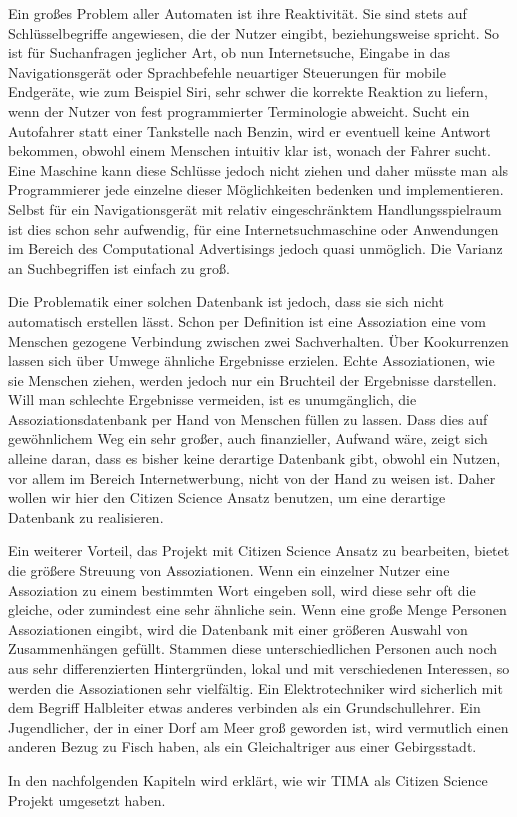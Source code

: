 Ein großes Problem aller Automaten ist ihre Reaktivität. Sie sind stets auf Schlüsselbegriffe angewiesen, die der Nutzer eingibt, beziehungsweise spricht.  So ist für Suchanfragen jeglicher Art, ob nun Internetsuche, Eingabe in das Navigationsgerät oder Sprachbefehle neuartiger Steuerungen für mobile Endgeräte, wie zum Beispiel Siri, sehr schwer die korrekte Reaktion zu liefern, wenn der Nutzer von fest programmierter Terminologie abweicht. Sucht ein Autofahrer statt einer Tankstelle nach Benzin, wird er eventuell keine Antwort bekommen, obwohl einem Menschen intuitiv klar ist, wonach der Fahrer sucht. Eine Maschine kann diese Schlüsse jedoch nicht ziehen und daher müsste man als Programmierer jede einzelne dieser Möglichkeiten bedenken und implementieren. Selbst für ein Navigationsgerät mit relativ eingeschränktem Handlungsspielraum ist dies schon sehr aufwendig, für eine Internetsuchmaschine oder Anwendungen im Bereich des Computational Advertisings jedoch quasi unmöglich. Die Varianz an Suchbegriffen ist einfach zu groß. 

Die Problematik einer solchen Datenbank ist jedoch, dass sie sich nicht automatisch erstellen lässt. Schon per Definition ist eine Assoziation eine vom Menschen gezogene Verbindung zwischen zwei Sachverhalten. Über Kookurrenzen lassen sich über Umwege ähnliche Ergebnisse erzielen. %
Echte Assoziationen, wie sie Menschen ziehen, werden jedoch nur ein Bruchteil der Ergebnisse darstellen. Will man schlechte Ergebnisse vermeiden, ist es unumgänglich, die Assoziationsdatenbank per Hand von Menschen füllen zu lassen. Dass dies auf gewöhnlichem Weg ein sehr großer, auch finanzieller, Aufwand wäre, zeigt sich alleine daran, dass es bisher keine derartige Datenbank gibt, obwohl ein Nutzen, vor allem im Bereich Internetwerbung, nicht von der Hand zu weisen ist. Daher wollen wir hier den Citizen Science Ansatz benutzen, um eine derartige Datenbank zu realisieren.

Ein weiterer Vorteil, das Projekt mit Citizen Science Ansatz zu bearbeiten, bietet die größere Streuung von Assoziationen. Wenn ein einzelner Nutzer eine Assoziation zu einem bestimmten Wort eingeben soll, wird diese sehr oft die gleiche, oder zumindest eine sehr ähnliche sein. Wenn eine große Menge Personen Assoziationen eingibt, wird die Datenbank mit einer größeren Auswahl von Zusammenhängen gefüllt. Stammen diese unterschiedlichen Personen auch noch aus sehr differenzierten Hintergründen, lokal und mit verschiedenen Interessen, so werden die Assoziationen sehr vielfältig. Ein Elektrotechniker wird sicherlich mit dem Begriff Halbleiter etwas anderes verbinden als ein Grundschullehrer. Ein Jugendlicher, der in einer Dorf am Meer groß geworden ist, wird vermutlich einen anderen Bezug zu Fisch haben, als ein Gleichaltriger aus einer Gebirgsstadt.

In den nachfolgenden Kapiteln wird erklärt, wie wir TIMA als Citizen Science Projekt umgesetzt haben.
